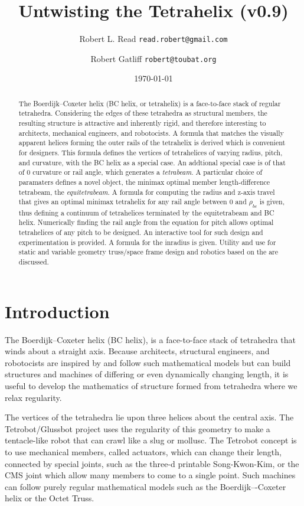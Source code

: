 \documentclass[11pt]{article}
\title{Untwisting the Tetrahelix (v0.9)}
\author{Robert L. Read \texttt{read.robert@gmail.com} \and
  Robert Gatliff \texttt{robert@toubat.org}
}
\date{\today}
\begin{document}
\maketitle


\begin{abstract}
  The Boerdijk--Coxeter helix (BC helix, or tetrahelix) is a
  face-to-face stack of regular tetrahedra.  Considering the edges of
  these tetrahedra as structural members, the resulting structure is attractive and
  inherently rigid, and therefore interesting to architects,
  mechanical engineers, and robotocists.  A formula that matches the
  visually apparent helices forming the outer rails of the tetrahelix
  is derived which is convenient for designers.  This formula defines
  the vertices of tetrahelices of varying radius, pitch, and
  curvature, with the BC helix as a special case.  An addtional
  special case is of that of $0$ curvature or rail angle, which
  generates a \emph{tetrabeam}.  A particular choice of paramaters
  defines a novel object, the minimax optimal member length-difference
  tetrabeam, the \emph{equitetrabeam}.  A formula for computing the
  radius and z-axis travel that gives an optimal minimax tetrahelix
  for any rail angle between $0$ and $\rho_{bc}$ is given, thus
  defining a continuum of tetrahelices terminated by the equitetrabeam
  and BC helix. Numerically finding the rail angle from the equation for
  pitch allows optimal tetrahelices of any pitch to be designed. 
  An interactive tool for such design and experimentation is provided.
  A formula
  for the inradius is given.
  Utility and use for static and variable geometry
  truss/space frame design and robotics based on the are discussed.
\end{abstract}


\section{Introduction}

The Boerdijk--Coxeter helix\cite{coxeter1985simplicial} (BC helix), is
a face-to-face stack of tetrahedra that winds about a straight axis.
Because architects, structural engineers, and robotocists are inspired
by and follow such mathematical models but can build structures and
machines of differing or even dynamically changing length, it is
useful to develop the mathematics of structure formed from tetrahedra
where we relax regularity.


The vertices of the tetrahedra lie upon
three helices about the central axis.  The
Tetrobot/Glussbot\cite{TetrobotBook} project uses the regularity of
this geometry to make a tentacle-like robot that can crawl like a slug
or mollusc.  The Tetrobot concept is to use mechanical members, called
actuators, which can change their length, connected by special joints,
such as the three-d printable Song-Kwon-Kim\cite{song2003spherical}, or the CMS joint\cite{HamlinSandersonCMS}
which allow many members to come to a single point.
Such machines can
follow purely regular mathematical models such as the Boerdijk–-Coxeter
helix or the Octet Truss\cite{richard1961synergetic}.
\end{document}
